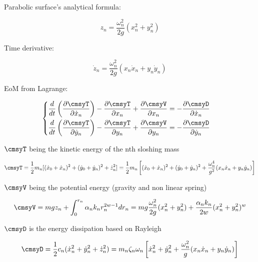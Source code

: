 \documentclass{ltxdockit}
\begin{document}
Parabolic surface's analytical formula:

\begin{equation}
z_n = \frac{\omega_{n}^{2}}{2g}(x_{n}^{2} + y_{n}^{2})
\end{equation}

Time derivative:

\begin{equation}
\dot z_n = \frac{\omega_{n}^{2}}{2g}(x_{n} \dot x_{n} + y_{n} \dot y_{n})
\end{equation}

EoM from Lagrange:

\begin{equation}
\begin{cases}
\begin{aligned}

\frac{d}{dt}\left(\frac{\partial \cmsyT}{\partial \dot x_n}\right) - \frac{\partial \cmsyT}{\partial x_n} + \frac{\partial \cmsyV}{\partial x_n} &= -\frac{\partial \cmsyD}{\partial \dot x_n} \\
\frac{d}{dt}\left(\frac{\partial \cmsyT}{\partial \dot y_n}\right) - \frac{\partial \cmsyT}{\partial y_n} + \frac{\partial \cmsyV}{\partial y_n} &= -\frac{\partial \cmsyD}{\partial \dot y_n} \\

\end{aligned}
\end{cases}
\end{equation}

\(\cmsyT\) being the kinetic energy of the nth sloshing mass 

\begin{equation}
\cmsyT = \frac{1}{2}m_n[(\dot x_0 + \dot x_n)^2 + (\dot y_0 + \dot y_n)^2 + \dot z_n^2] =  \frac{1}{2}m_n \left[(\dot x_0 + \dot x_n)^2 + (\dot y_0 + \dot y_n)^2 + \frac{\omega_n^4}{g^2}(x_n \dot x_n + y_n \dot y_n) \right]
\end{equation}

\(\cmsyV\) being the potential energy (gravity and non linear spring)

\begin{equation}
\cmsyV = m g z_n + \int_{0}^{r_n} \alpha_n k_n r_{n}^{2w - 1} d r_n = m g \frac{\omega_n^2}{2g}(x_n^2 + y_n^2) + \frac{\alpha_n k_n}{2w}(x_n^2 + y_n^2)^w
\end{equation}

\(\cmsyD\) is the energy dissipation based on Rayleigh

\begin{equation}
\cmsyD = \frac{1}{2} c_n (\dot x_n^2 + \dot y_n^2 + \dot z_n^2) = m_n \zeta_n \omega_n \left[\dot x_n^2 + \dot y_n^2 + \frac{\omega_n^2}{g}(x_n \dot x_n + y_n \dot y_n)\right] 
\end{equation}
\end{document}
